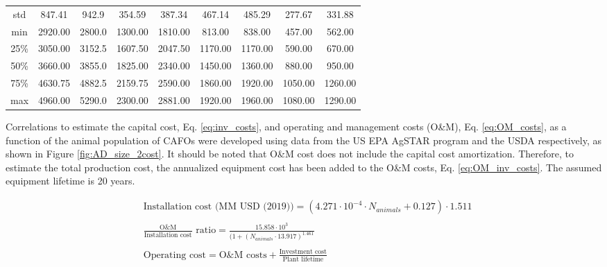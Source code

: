 \documentclass[10pt,a4paper]{article}
\begin{document}
\begin{table}[H]
{\begin{tabular}{ccccccccc}
		std   &   847.41 &       942.9 &    354.59 &               387.34 &              467.14 &              485.29 &               277.67 &               331.88    \\      
		min   &   2920.00 &     2800.0 &    1300.00 &              1810.00 &              813.00 &              838.00 &               457.00 &               562.00   \\    
		25\%   &  3050.00 &     3152.5 &    1607.50 &              2047.50 &             1170.00 &             1170.00 &               590.00 &               670.00   \\  
		50\%   & 3660.00 &     3855.0 &     1825.00 &              2340.00 &             1450.00 &             1360.00 &               880.00 &               950.00   \\
		75\%   & 4630.75 &      4882.5 &    2159.75 &              2590.00 &             1860.00 &             1920.00 &              1050.00 &              1260.00   \\
		max   &     4960.00 &   5290.0 &     2300.00 &              2881.00 &             1920.00 &             1960.00 &              1080.00 &              1290.00  \\
		\bottomrule
	\end{tabular}}
\end{table}

Correlations to estimate the capital cost, Eq. \ref{eq:inv_costs}, and operating and management costs (O\&M), Eq. \ref{eq:OM_costs}, as a function of the animal population of CAFOs were developed using data from the US EPA AgSTAR program  and the USDA  respectively, as shown in Figure \ref{fig:AD_size_2cost}. It should be noted that O\&M cost does not include the capital cost amortization. Therefore, to estimate the total production cost, the annualized equipment cost has been added to the O\&M costs, Eq.  \ref{eq:OM_inv_costs}. The assumed equipment lifetime is 20 years.

\begin{align} 
	& \text{Installation cost (MM USD (2019))} = \left(4.271 \cdot 10^{-4} \cdot N_{animals}+0.127\right) \cdot 1.511 \label{eq:inv_costs}\\ \nonumber\\
	& \frac{\text{O\&M}} {\text{Installation cost}} \text{ ratio} = \frac{15.858\cdot 10^{3}}{(1+\left(N_{animals} \cdot 13.917\right)^{1.461}} \label{eq:OM_costs}\\ \nonumber\\
	& \text{Operating cost} = \text{O\&M costs} + \frac{\text{Investment cost}}{\text{Plant lifetime}} \label{eq:OM_inv_costs}
\end{align}
\end{document}

